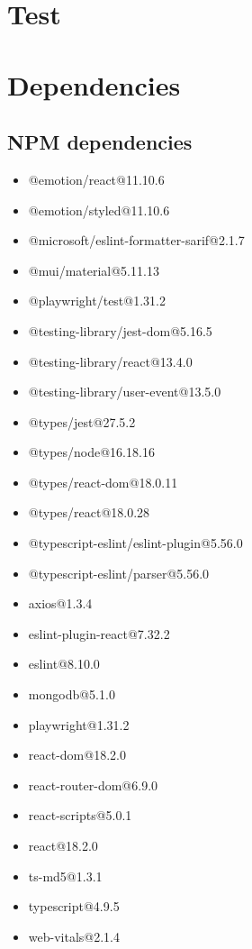 
\appendix
\appendixpage

\chapter{Test}
\label{appendix:test}

\chapter{Dependencies}
\label{appendix:dependencies}
\section{NPM dependencies}
\begin{itemize}
    \item @emotion/react@11.10.6
    \item @emotion/styled@11.10.6
    \item @microsoft/eslint-formatter-sarif@2.1.7
    \item @mui/material@5.11.13
    \item @playwright/test@1.31.2
    \item @testing-library/jest-dom@5.16.5
    \item @testing-library/react@13.4.0
    \item @testing-library/user-event@13.5.0
    \item @types/jest@27.5.2
    \item @types/node@16.18.16 
    \item @types/react-dom@18.0.11
    \item @types/react@18.0.28
    \item @typescript-eslint/eslint-plugin@5.56.0
    \item @typescript-eslint/parser@5.56.0
    \item axios@1.3.4
    \item eslint-plugin-react@7.32.2
    \item eslint@8.10.0
    \item mongodb@5.1.0
    \item playwright@1.31.2
    \item react-dom@18.2.0
    \item react-router-dom@6.9.0
    \item react-scripts@5.0.1
    \item react@18.2.0
    \item ts-md5@1.3.1
    \item typescript@4.9.5
    \item web-vitals@2.1.4
\end{itemize} 

